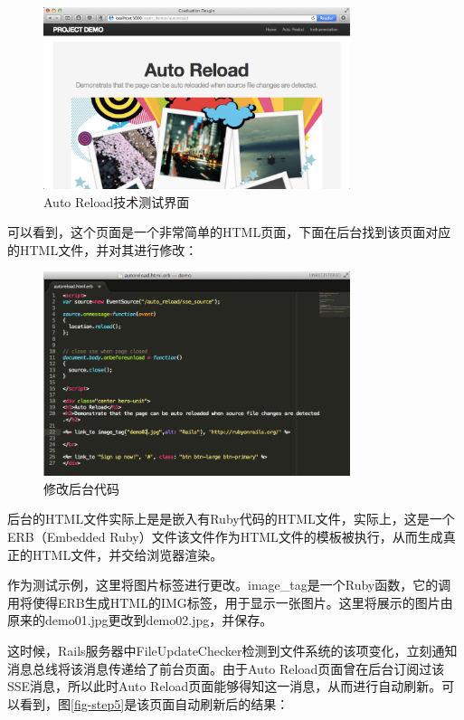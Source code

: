 \begin{figure}[h]
\centering
\includegraphics[width=0.8\textwidth]{images/test/3.png}
\caption{Auto Reload技术测试界面}
\label{fig-step3}
\end{figure}

可以看到，这个页面是一个非常简单的HTML页面，下面在后台找到该页面对应的HTML文件，并对其进行修改：

\begin{figure}[h]
\centering
\includegraphics[width=0.8\textwidth]{images/test/4.png}
\caption{修改后台代码}
\label{fig-step4}
\end{figure}

后台的HTML文件实际上是是嵌入有Ruby代码的HTML文件，实际上，这是一个ERB（Embedded Ruby）文件该文件作为HTML文件的模板被执行，从而生成真正的HTML文件，并交给浏览器渲染。

作为测试示例，这里将图片标签进行更改。image\_tag是一个Ruby函数，它的调用将使得ERB生成HTML的IMG标签，用于显示一张图片。这里将展示的图片由原来的demo01.jpg更改到demo02.jpg，并保存。

这时候，Rails服务器中FileUpdateChecker检测到文件系统的该项变化，立刻通知消息总线将该消息传递给了前台页面。由于Auto Reload页面曾在后台订阅过该SSE消息，所以此时Auto Reload页面能够得知这一消息，从而进行自动刷新。可以看到，图\ref{fig-step5}是该页面自动刷新后的结果：

